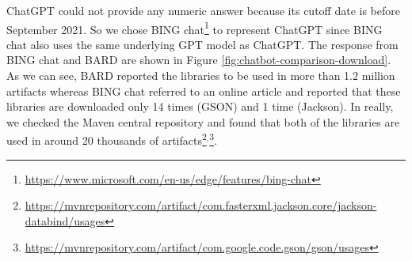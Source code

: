 ChatGPT could not provide any numeric answer because its cutoff date is before September 2021. So we chose BING chat\footnote{\url{https://www.microsoft.com/en-us/edge/features/bing-chat}} to represent ChatGPT since BING chat also uses the same underlying GPT model as ChatGPT. The response from BING chat and BARD are shown in Figure \ref{fig:chatbot-comparison-download}. As we can see, BARD reported the libraries to be used in more than 1.2 million artifacts whereas BING chat referred to an online article and reported that these libraries are downloaded only 14 times (GSON) and 1 time (Jackson). In really, we checked the Maven central repository and found that both of the libraries are used in around 20 thousands of artifacts\footnote{\url{https://mvnrepository.com/artifact/com.fasterxml.jackson.core/jackson-databind/usages}}$^,$\footnote{\url{https://mvnrepository.com/artifact/com.google.code.gson/gson/usages}}.


